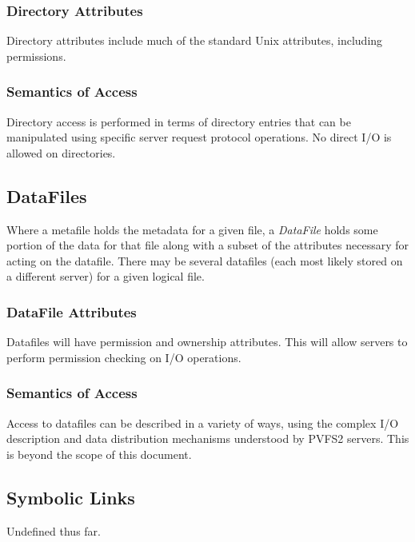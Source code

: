 \documentclass[11pt, letterpaper]{article}
\begin{document}
\subsubsection{Directory Attributes}

Directory attributes include much of the standard Unix attributes,
including permissions.

\subsubsection{Semantics of Access}

Directory access is performed in terms of directory entries that can be
manipulated using specific server request protocol operations.  No
direct I/O is allowed on directories.

%
%
\subsection{DataFiles}

Where a metafile holds the metadata for a given file, a {\em DataFile}
holds some portion of the data for that file along with a subset of the
attributes necessary for acting on the datafile.  There may be several
datafiles (each most likely stored on a different server) for a given
logical file.

\subsubsection{DataFile Attributes}

Datafiles will have permission and ownership attributes.  This will
allow servers to perform permission checking on I/O operations.

\subsubsection{Semantics of Access}

Access to datafiles can be described in a variety of ways, using the
complex I/O description and data distribution mechanisms understood by
PVFS2 servers.  This is beyond the scope of this document.

%
%
\subsection{Symbolic Links}

Undefined thus far.
\end{document}
